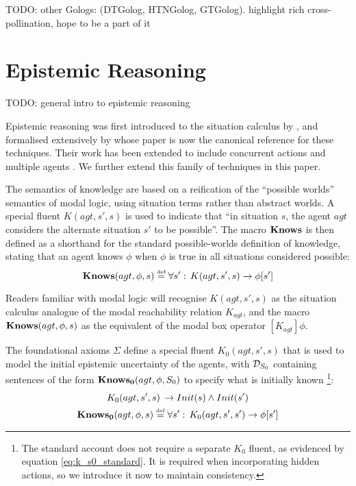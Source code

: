 TODO: other Gologs: (DTGolog, HTNGolog, GTGolog). highlight rich cross-pollination,
hope to be a part of it


\section{Epistemic Reasoning\label{sec:Background:Epistemic-Reasoning}}

TODO: general intro to epistemic reasoning \citet{halpern90knowledge_distrib,fagin95}

Epistemic reasoning was first introduced to the situation calculus
by \citet{moore80know_act}, and formalised extensively by \citet{scherl03sc_knowledge}
whose paper is now the canonical reference for these techniques. Their
work has been extended to include concurrent actions \citet{scherl03conc_knowledge}
and multiple agents \citet{shapiro98specifying_ma_systems}. We further
extend this family of techniques in this paper.

The semantics of knowledge are based on a reification of the {}``possible
worlds'' semantics of modal logic, using situation terms rather than
abstract worlds. A special fluent $K(agt,s',s)$ is used to indicate
that {}``in situation $s$, the agent $agt$ considers the alternate
situation $s'$ to be possible''. The macro $\mathbf{Knows}$ is then defined
as a shorthand for the standard possible-worlds definition of knowledge,
stating that an agent knows $\phi$ when $\phi$ is true in all situations
considered possible: \begin{equation}
\mathbf{Knows}(agt,\phi,s)\stackrel{\mbox{\tiny def}}{=}\forall s':\, K(agt,s',s)\rightarrow\phi[s']\label{eqn:knows_def}\end{equation}


Readers familiar with modal logic will recognise $K(agt,s',s)$ as
the situation calculus analogue of the modal reachability relation
$K_{agt}$, and the macro $\mathbf{Knows}(agt,\phi,s)$ as the equivalent
of the modal box operator $[K_{agt}]\phi$.

The foundational axioms $\Sigma$ define a special fluent $K_{0}(agt,s',s)$
that is used to model the initial epistemic uncertainty of the agents,
with $\mathcal{D}_{S_{0}}$ containing sentences of the form $\mathbf{Knows_{0}}(agt,\phi,S_{0})$
to specify what is initially known%
\footnote{The standard account does not require a separate $K_{0}$ fluent,
as evidenced by equation \eqref{eq:k_s0_standard}. It is required
when incorporating hidden actions, so we introduce it now to maintain
consistency. %
}:\begin{gather*}
K_{0}(agt,s',s)\,\rightarrow Init(s)\wedge Init(s')\\
\mathbf{Knows_{0}}(agt,\phi,s)\stackrel{\mbox{\tiny def}}{=}\forall s':\, K_{0}(agt,s',s')\rightarrow\phi[s']\end{gather*}


